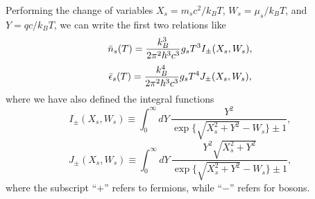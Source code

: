 Performing the change of variables $X_s = m_sc^2/k_BT$, $W_s = \mu_s/k_BT$, and $Y = qc/k_BT$, we can write the first two relations like 
\begin{equation}
    \bar{n}_s(T) = \frac{k_B^3}{2\pi^2\hbar^3c^3}g_sT^3I_\pm(X_s,W_s),
\end{equation}
\begin{equation}
    \bar{\epsilon}_s(T) = \frac{k_B^4}{2\pi^2\hbar^3c^3}g_sT^4J_\pm(X_s,W_s),
\end{equation}
where we have also defined the integral functions 
\begin{equation}
\label{eq: I+- integral function}
    I_\pm(X_s,W_s) \equiv \int_0^\infty dY\,\frac{Y^2}{\exp{\{\sqrt{X_s^2 + Y^2} - W_s\}} \pm 1},
\end{equation}
\begin{equation}
\label{eq: J+- integral function}
    J_\pm(X_s,W_s) \equiv \int_0^\infty dY\,\frac{Y^2\sqrt{X_s^2 + Y^2}}{\exp{\{\sqrt{X_s^2 + Y^2} - W_s\}} \pm 1},
\end{equation}
where the subscript ``$+$'' refers to fermions, while ``$-$'' refers for bosons.

